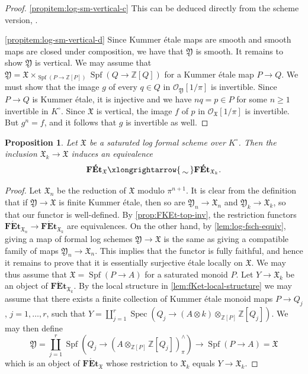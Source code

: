 \documentclass[a4paper,twoside,11pt,reqno]{amsart}
\renewcommand{\mathbb}{\mathds}
\newcommand{\bZ}{{\mathbb Z}}
\newcommand{\cO}{{\mathcal O}}
\newcommand{\fX}{{\mathfrak{X}}}
\newcommand{\fY}{{\mathfrak{Y}}}
\newcommand{\isomto}{\xlongrightarrow{\,\smash{\raisebox{-0.65ex} 
    {\ensuremath{\displaystyle\sim}}}\,}}
\newcommand{\la}{\longrightarrow}
\DeclareMathOperator{\Spec}{Spec}
\DeclareMathOperator{\Spf}{Spf}
\newcommand{\cat}[1]{\mathbf{#1}}
\newcommand{\FEt}{\cat{F\acute{E}t}}
\newtheorem{prop}[thm]{Proposition}
\theoremstyle{definition}
\numberwithin{equation}{subsection}
\begin{document}
\begin{proof}
\ref{propitem:log-sm-vertical-c} This can be deduced directly from the scheme version, \cite[Corollary~5.3.7]{AHLS-Log}.

\ref{propitem:log-sm-vertical-d} Since Kummer \'etale maps are smooth and smooth maps are closed under composition, we have that $\fY$ is smooth. It remains to show $\fY$ is vertical. We may assume that $\fY = \fX\times_{\Spf(P\to \bZ[P])}\Spf(Q\to\bZ[Q])$ for a Kummer \'etale map $P\to Q$. We must show that the image $g$ of every $q\in Q$ in $\cO_\fY[1/\pi]$ is invertible. Since $P\to Q$ is Kummer \'etale, it is injective and we have $nq=p\in P$ for some $n\geq 1$ invertible in $K^\circ$. Since $\fX$ is vertical, the image $f$ of $p$ in $\cO_\fX[1/\pi]$ is invertible. But $g^n=f$, and it follows that $g$ is invertible as well.
\end{proof}

\begin{prop} \label{prop:FEt-formal-vs-sp-fibre}
    Let $\fX$ be a saturated log formal scheme over $K^\circ$. Then the inclusion $\fX_k\to \fX$ induces an equivalence
    \[
        \FEt_\fX \isomto \FEt_{\fX_k}.
    \]
\end{prop}

\begin{proof}
Let $\fX_n$ be the reduction of $\fX$ modulo $\pi^{n+1}$. It is clear from the definition that if $\fY\to\fX$ is finite Kummer \'etale, then so are $\fY_n\to\fX_n$ and $\fY_k\to \fX_k$, so that our functor is well-defined. By \cref{prop:FKEt-top-inv}, the restriction functors $\FEt_{\fX_n}\to\FEt_{\fX_k}$ are equivalences. On the other hand, by \cref{lem:log-fsch-equiv}, giving a map of formal log schemes $\fY\to\fX$ is the same as giving a compatible family of maps $\fY_n\to \fX_n$. This implies that the functor is fully faithful, and hence it remains to prove that it is essentially surjective \'etale locally on $\fX$. We may thus assume that $\fX=\Spf(P\to A)$ for a saturated monoid $P$. Let $Y\to \fX_k$ be an object of $\FEt_{\fX_k}$. By the local structure in \cref{lem:fKet-local-structure} we may assume that there exists a finite collection of Kummer \'etale monoid maps $P\to Q_j$, $j=1,\dots, r$, such that $Y = \coprod_{j=1}^r \Spec(Q_j \to (A\otimes k)\otimes_{\bZ[P]}\bZ[Q_j])$. We may then define 
\[
    \fY = \coprod_{j=1}^r \Spf(Q_j \to (A\otimes_{\bZ[P]}\bZ[Q_j])^\wedge_\pi) \la \Spf(P\to A) = \fX
\]
which is an object of $\FEt_\fX$ whose restriction to $\fX_k$ equals $Y\to\fX_k$.
\end{proof}
\end{document}
